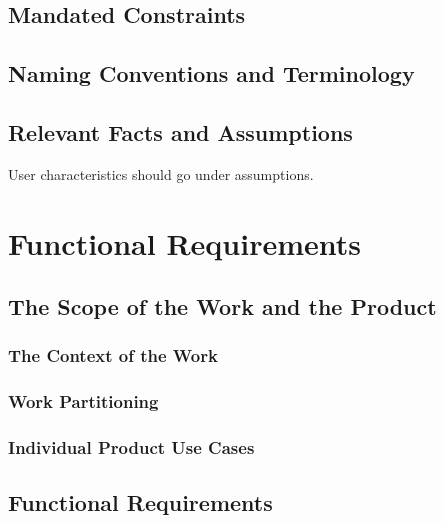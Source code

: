 \documentclass[12pt, titlepage]{article}
\begin{document}
\subsection{Mandated Constraints}

\subsection{Naming Conventions and Terminology}

\subsection{Relevant Facts and Assumptions}

User characteristics should go under assumptions.

\section{Functional Requirements}

\subsection{The Scope of the Work and the Product}

\subsubsection{The Context of the Work}

\subsubsection{Work Partitioning}

\subsubsection{Individual Product Use Cases}

\newpage
\subsection{Functional Requirements}

\end{document}
